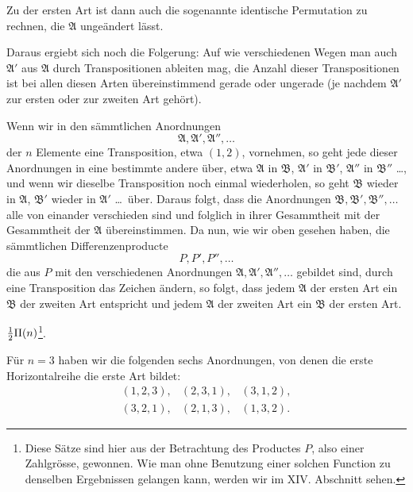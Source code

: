 

Zu der ersten Art ist dann auch die sogenannte identische Permutation zu rechnen, die \(\mathfrak A\) ungeändert lässt.

Daraus ergiebt sich noch die Folgerung: Auf wie verschiedenen Wegen man auch \(\mathfrak A'\) aus \(\mathfrak A\) durch Transpositionen ableiten mag, die Anzahl dieser Transpositionen ist bei allen diesen Arten übereinstimmend gerade oder ungerade (je nachdem \(\mathfrak A'\) zur ersten oder zur zweiten Art gehört).

Wenn wir in den sämmtlichen Anordnungen
\[
\mathfrak A,\mathfrak A',\mathfrak A'',\ldots
\]
der \(n\) Elemente eine Transposition, etwa \((1,2)\), vornehmen, so geht jede dieser Anordnungen in eine bestimmte andere über, etwa \(\mathfrak A\) in \(\mathfrak B\), \(\mathfrak A'\) in \(\mathfrak B'\), \(\mathfrak A''\) in \(\mathfrak B''\) \ldots, und wenn wir dieselbe Transposition noch einmal wiederholen, so geht \(\mathfrak B\) wieder in \(\mathfrak A\), \(\mathfrak B'\) wieder in \(\mathfrak A'\) \ldots\ über. Daraus folgt, dass die Anordnungen \(\mathfrak B,\mathfrak B',\mathfrak B'',\ldots\) alle von einander verschieden sind und folglich in ihrer Gesammtheit mit der Gesammtheit der \(\mathfrak A\) übereinstimmen. Da nun, wie wir oben gesehen haben, die sämmtlichen Differenzenproducte
\[
P,P',P'',\ldots
\]
die aus \(P\) mit den verschiedenen Anordnungen \(\mathfrak A,\mathfrak A',\mathfrak A'',\ldots\) gebildet sind, durch eine Transposition das Zeichen ändern, so folgt, dass jedem \(\mathfrak A\) der ersten Art ein \(\mathfrak B\) der zweiten Art entspricht und jedem \(\mathfrak A\) der zweiten Art ein \(\mathfrak B\) der ersten Art.

 \({1\over2}\Pi(n)\)\footnote{Diese Sätze sind hier aus der Betrachtung des Productes \(P\), also einer Zahlgrösse, gewonnen. Wie man ohne Benutzung einer solchen Function zu denselben Ergebnissen gelangen kann, werden wir im XIV. Abschnitt sehen.}.

Für \(n=3\) haben wir die folgenden sechs Anordnungen, von denen die erste Horizontalreihe die erste Art bildet:
\begin{equation}
\begin{array}{ccc}
(1,2,3),&(2,3,1),&(3,1,2),\\
(3,2,1),&(2,1,3),&(1,3,2).
\end{array}
\tag{3}
\end{equation}
